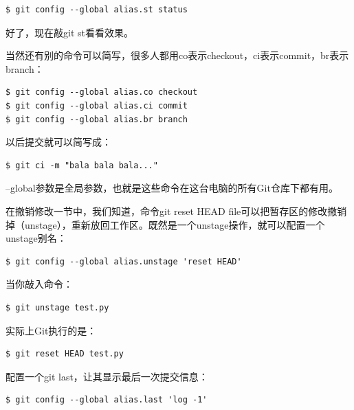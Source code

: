 \begin{verbatim}
$ git config --global alias.st status
\end{verbatim}

好了，现在敲git st看看效果。

当然还有别的命令可以简写，很多人都用co表示checkout，ci表示commit，br表示branch：

\begin{verbatim}
$ git config --global alias.co checkout
$ git config --global alias.ci commit
$ git config --global alias.br branch
\end{verbatim}

以后提交就可以简写成：

\begin{verbatim}
$ git ci -m "bala bala bala..."
\end{verbatim}

--global参数是全局参数，也就是这些命令在这台电脑的所有Git仓库下都有用。

在撤销修改一节中，我们知道，命令git reset HEAD file可以把暂存区的修改撤销掉（unstage），重新放回工作区。既然是一个unstage操作，就可以配置一个unstage别名：

\begin{verbatim}
$ git config --global alias.unstage 'reset HEAD'
\end{verbatim}

当你敲入命令：

\begin{verbatim}
$ git unstage test.py
\end{verbatim}

实际上Git执行的是：

\begin{verbatim}
$ git reset HEAD test.py
\end{verbatim}

配置一个git last，让其显示最后一次提交信息：

\begin{verbatim}
$ git config --global alias.last 'log -1'
\end{verbatim}

